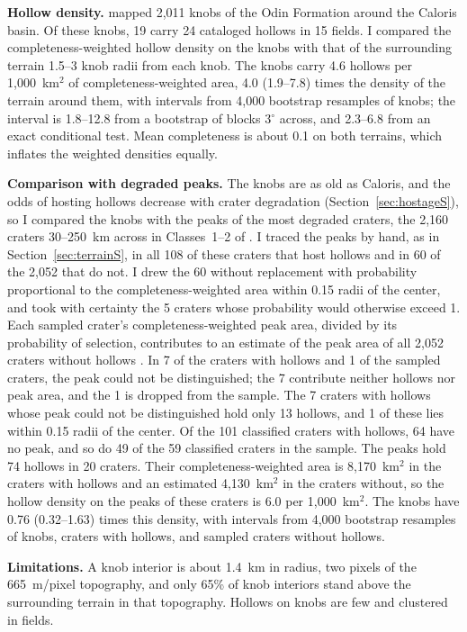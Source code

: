\documentclass{planetary}
\begin{document}
\textbf{Hollow density.} \textcite{wright2020} mapped 2,011 knobs of the Odin Formation around the Caloris basin. Of these knobs, 19 carry 24 cataloged hollows in 15 fields. I compared the completeness-weighted hollow density on the knobs with that of the surrounding terrain 1.5--3 knob radii from each knob. The knobs carry 4.6 hollows per 1,000~km$^2$ of completeness-weighted area, 4.0 (1.9--7.8) times the density of the terrain around them, with intervals from 4,000 bootstrap resamples of knobs; the interval is 1.8--12.8 from a bootstrap of blocks 3$^\circ$ across, and 2.3--6.8 from an exact conditional test. Mean completeness is about 0.1 on both terrains, which inflates the weighted densities equally.

\textbf{Comparison with degraded peaks.} The knobs are as old as Caloris, and the odds of hosting hollows decrease with crater degradation (Section~\ref{sec:hostageS}), so I compared the knobs with the peaks of the most degraded craters, the 2,160 craters 30--250~km across in Classes~1--2 of \textcite{kinczykMorphologicalEvaluationCrater2020}. I traced the peaks by hand, as in Section~\ref{sec:terrainS}, in all 108 of these craters that host hollows and in 60 of the 2,052 that do not. I drew the 60 without replacement with probability proportional to the completeness-weighted area within 0.15 radii of the center, and took with certainty the 5 craters whose probability would otherwise exceed 1. Each sampled crater's completeness-weighted peak area, divided by its probability of selection, contributes to an estimate of the peak area of all 2,052 craters without hollows \parencite[the Horvitz--Thompson estimator;][]{horvitz1952}. In 7 of the craters with hollows and 1 of the sampled craters, the peak could not be distinguished; the 7 contribute neither hollows nor peak area, and the 1 is dropped from the sample. The 7 craters with hollows whose peak could not be distinguished hold only 13 hollows, and 1 of these lies within 0.15 radii of the center. Of the 101 classified craters with hollows, 64 have no peak, and so do 49 of the 59 classified craters in the sample. The peaks hold 74 hollows in 20 craters. Their completeness-weighted area is 8,170~km$^2$ in the craters with hollows and an estimated 4,130~km$^2$ in the craters without, so the hollow density on the peaks of these craters is 6.0 per 1,000~km$^2$. The knobs have 0.76 (0.32--1.63) times this density, with intervals from 4,000 bootstrap resamples of knobs, craters with hollows, and sampled craters without hollows.

\textbf{Limitations.} A knob interior is about 1.4~km in radius, two pixels of the 665~m/pixel topography, and only 65\% of knob interiors stand above the surrounding terrain in that topography. Hollows on knobs are few and clustered in fields.

\clearpage

\printbibliography

\license{}
\end{document}

